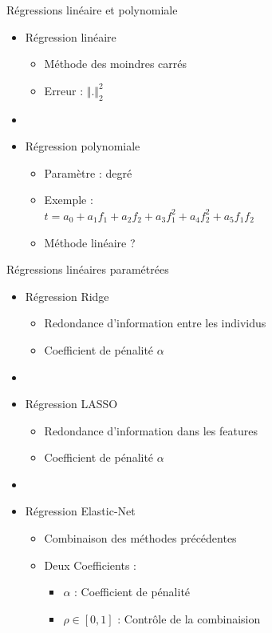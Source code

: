 \documentclass{beamer}
\begin{document}
\begin{frame}{Régressions linéaire et polynomiale}
  \begin{itemize}
    \item Régression linéaire
    \begin{itemize}
      \item Méthode des moindres carrés
      \item Erreur : $\Vert.\Vert_2^2$
    \end{itemize}
    \item[]
    \item Régression polynomiale
    \begin{itemize}
      \item Paramètre : degré
      \item Exemple :\\
      \begin{math}
        t = a_0+a_1f_1+a_2f_2+a_3f_1^2+a_4f_2^2+a_5f_1f_2
      \end{math}
      \item Méthode linéaire ?
    \end{itemize}
  \end{itemize}
\end{frame}

\begin{frame}{Régressions linéaires paramétrées}
  \begin{itemize}
    \item Régression Ridge
    \begin{itemize}
      \item Redondance d'information entre les individus
      \item Coefficient de pénalité $\alpha$
    \end{itemize}
    \item[]
    \item Régression LASSO
    \begin{itemize}
      \item Redondance d'information dans les features
      \item Coefficient de pénalité $\alpha$
    \end{itemize}
    \item[]
    \item Régression Elastic-Net
    \begin{itemize}
      \item Combinaison des méthodes précédentes
      \item Deux Coefficients :
      \begin{itemize}
        \item $\alpha$ : Coefficient de pénalité
        \item $\rho \in [0,1]$ : Contrôle de la combinaision
      \end{itemize}
    \end{itemize}
  \end{itemize}
\end{frame}
\end{document}
